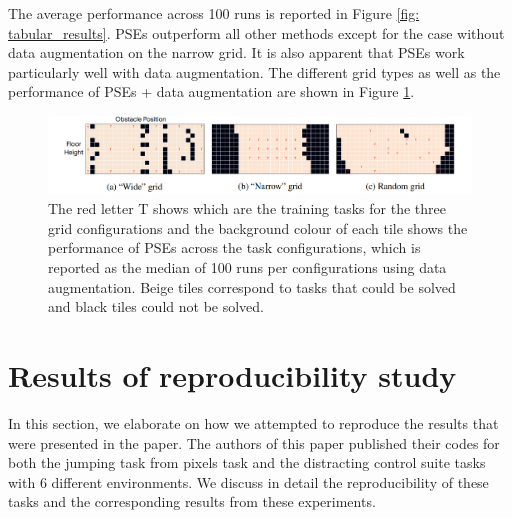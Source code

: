 \documentclass{usiinftr}
\begin{document}
The average performance across 100 runs is reported in Figure \ref{fig: tabular_results}. 
PSEs outperform all other methods except for the case without data augmentation on the narrow grid. It is also apparent that PSEs work particularly well with data augmentation.
The different grid types as well as the performance of PSEs + data augmentation are shown in Figure \ref{fig: grid_results}.

\begin{figure}[h] 
\centering
\includegraphics[width = 1\textwidth]{figures/grid_results.png}
\caption{\label{fig: grid_results}The red letter T shows which are the training tasks for the three grid configurations and the background colour of each tile shows the performance of PSEs across the task configurations, which is reported as the median of 100 runs per configurations using data augmentation. Beige tiles correspond to tasks that could be solved and black tiles could not be solved. \cite{agarwal2021contrastive}}
\end{figure}

\section{Results of reproducibility study}
In this section, we elaborate on how we attempted to reproduce the results that were presented in the paper. The authors of this paper published their codes for both the jumping task from pixels task and the distracting control suite tasks with 6 different environments. We discuss in detail the reproducibility of these tasks and the corresponding results from these experiments.
\end{document}
